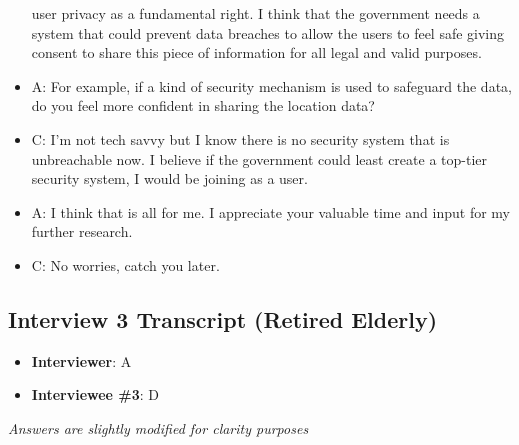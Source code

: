 \begin{itemize}
    user privacy as a fundamental right. I think that the government needs a system that could
    prevent data breaches to allow the users to feel safe giving consent to share this piece of
    information for all legal and valid purposes.
    \item A: For example, if a kind of security mechanism is used to safeguard the data, do you feel more
    confident in sharing the location data?
    \item C: I’m not tech savvy but I know there is no security system that is unbreachable now. I believe
    if the government could least create a top-tier security system, I would be joining as a user.
    \item A: I think that is all for me. I appreciate your valuable time and input for my further research.
    \item C: No worries, catch you later.
  \end{itemize}

\subsection{Interview 3 Transcript (Retired Elderly)}
  \begin{itemize}
    \item \textbf{Interviewer}: A
    \item \textbf{Interviewee \#3}: D
  \end{itemize}
  \par \textit{Answers are slightly modified for clarity purposes}

